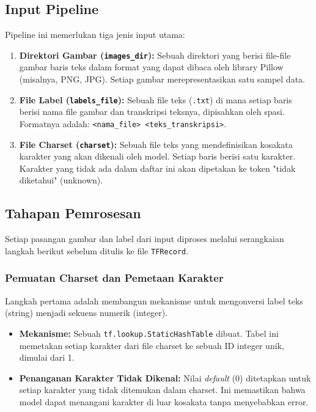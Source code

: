 \documentclass{article}
\begin{document}
\subsection{Input Pipeline}
Pipeline ini memerlukan tiga jenis input utama:
\begin{enumerate}
    \item \textbf{Direktori Gambar (\texttt{images\_dir}):} Sebuah direktori yang berisi file-file gambar baris teks dalam format yang dapat dibaca oleh library Pillow (misalnya, PNG, JPG). Setiap gambar merepresentasikan satu sampel data.
    \item \textbf{File Label (\texttt{labels\_file}):} Sebuah file teks (\texttt{.txt}) di mana setiap baris berisi nama file gambar dan transkripsi teksnya, dipisahkan oleh spasi. Formatnya adalah: \texttt{<nama\_file> <teks\_transkripsi>}.
    \item \textbf{File Charset (\texttt{charset}):} Sebuah file teks yang mendefinisikan kosakata karakter yang akan dikenali oleh model. Setiap baris berisi satu karakter. Karakter yang tidak ada dalam daftar ini akan dipetakan ke token "tidak diketahui" (unknown).
\end{enumerate}

\subsection{Tahapan Pemrosesan}
Setiap pasangan gambar dan label dari input diproses melalui serangkaian langkah berikut sebelum ditulis ke file \texttt{TFRecord}.

\subsubsection{Pemuatan Charset dan Pemetaan Karakter}
Langkah pertama adalah membangun mekanisme untuk mengonversi label teks (string) menjadi sekuens numerik (integer).
\begin{itemize}
    \item \textbf{Mekanisme:} Sebuah \texttt{tf.lookup.StaticHashTable} dibuat. Tabel ini memetakan setiap karakter dari file charset ke sebuah ID integer unik, dimulai dari 1.
    \item \textbf{Penanganan Karakter Tidak Dikenal:} Nilai \textit{default} (0) ditetapkan untuk setiap karakter yang tidak ditemukan dalam charset. Ini memastikan bahwa model dapat menangani karakter di luar kosakata tanpa menyebabkan error.
\end{itemize}
\end{document}
